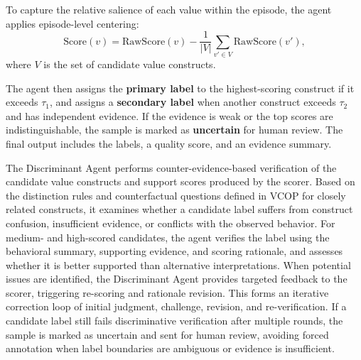 \documentclass[11pt]{article}
\begin{document}
To capture the relative salience of each value within the episode, the agent applies episode-level centering:
\[
\mathrm{Score}(v)
=
\mathrm{RawScore}(v)
-
\frac{1}{|V|}
\sum_{v' \in V}
\mathrm{RawScore}(v'),
\]
where \(V\) is the set of candidate value constructs.

The agent then assigns the \textbf{primary label} to the highest-scoring construct if it exceeds \(\tau_1\), and assigns a \textbf{secondary label} when another construct exceeds \(\tau_2\) and has independent evidence. If the evidence is weak or the top scores are indistinguishable, the sample is marked as \textbf{uncertain} for human review. The final output includes the labels, a quality score, and an evidence summary.

The Discriminant Agent performs counter-evidence-based verification of the candidate value constructs and support scores produced by the scorer. Based on the distinction rules and counterfactual questions defined in VCOP for closely related constructs, it examines whether a candidate label suffers from construct confusion, insufficient evidence, or conflicts with the observed behavior. For medium- and high-scored candidates, the agent verifies the label using the behavioral summary, supporting evidence, and scoring rationale, and assesses whether it is better supported than alternative interpretations. When potential issues are identified, the Discriminant Agent provides targeted feedback to the scorer, triggering re-scoring and rationale revision. This forms an iterative correction loop of initial judgment, challenge, revision, and re-verification. If a candidate label still fails discriminative verification after multiple rounds, the sample is marked as uncertain and sent for human review, avoiding forced annotation when label boundaries are ambiguous or evidence is insufficient.
\end{document}
